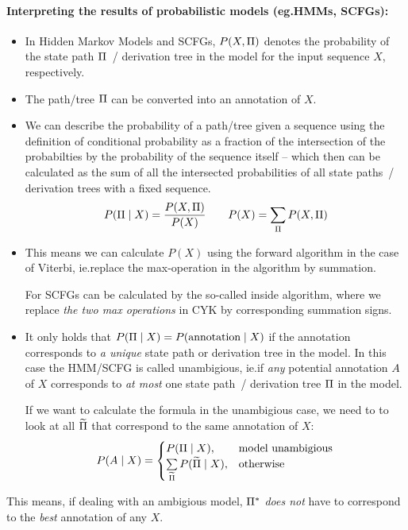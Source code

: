 \paragraph{Interpreting the results of probabilistic models (eg.\@ HMMs, SCFGs):}

\begin{itemize}
\item In Hidden Markov Models and SCFGs, \(P(X,\Pi)\) denotes the probability
  of the state path \(\Pi\)~/ derivation tree in the model for the input
  sequence \(X\), respectively.
\item The path/tree \(\Pi\) can be converted into an annotation of \(X\).
\item We can describe the probability of a path/tree given a sequence using the
  definition of conditional probability as a fraction of the intersection
  of the probabilties by the probability of the sequence itself -- which then
  can be calculated as the sum of all the intersected probabilities of all
  state paths~/ derivation trees with a fixed sequence.
  \[
    P(\Pi \mid X) = \frac{P(X,\Pi)}{P(X)} \qquad
    P(X) = \sum_{\Pi} P(X,\Pi)
  \]
\item This means we can calculate \(P(X)\) using the forward algorithm in the
  case of Viterbi, ie.\@ replace the max-operation in the algorithm by
  summation.

  For SCFGs can be calculated by the so-called inside algorithm, where we
  replace \emph{the two max operations} in CYK by corresponding summation
  signs.
\item It only holds that \(P(\Pi\mid X) = P(\text{annotation} \mid X)\) if
  the annotation corresponds to \emph{a unique} state path or
  derivation tree in the model.  In this case the HMM/SCFG is called
  unambigious, ie.\@ if \emph{any} potential annotation \(A\) of \(X\)
  corresponds to \emph{at most} one state path~/ derivation tree \(\Pi\) in
  the model.

  If we want to calculate the formula in the unambigious case, we need to  to
  look at all \(\widetilde{\Pi}\) that correspond to the same annotation of
  \(X\):
  \[
    P(A\mid X) = \begin{cases}
        P(\Pi \mid X), &\text{model unambigious} \\
        \sum\limits_{\widetilde{\Pi}} P(\widetilde{\Pi} \mid X), &\text{otherwise}
    \end{cases}
  \]
\end{itemize}

This means, if dealing with an ambigious model, \(\Pi^*\) \emph{does not}
have to correspond to the \emph{best} annotation of any \(X\).


